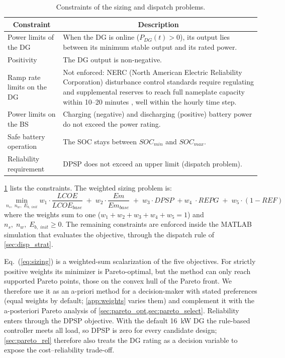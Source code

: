 \documentclass[final,3p,times]{elsarticle}
\begin{document}
\begin{table}[htbp] 
\centering
\begin{tabular}{p{5cm} p{10cm}}
\toprule
\multicolumn{1}{c}{\textbf{Constraint}} & \multicolumn{1}{c}{\textbf{Description}}    \\
\midrule
Power limits of the DG & When the DG is online ($P_{DG}(t) > 0$), its output lies between its minimum stable output and its rated power. \\ [1ex]
Positivity & The DG output is non-negative. \\ [1ex]
Ramp rate limits on the DG & Not enforced: NERC (North American Electric Reliability Corporation) disturbance control standards require regulating and supplemental reserves to reach full nameplate capacity within 10--20 minutes \cite{nerc}, well within the hourly time step. \\ [1ex]
Power limits on the BS & Charging (negative) and discharging (positive) battery power do not exceed the power rating. \\ [1ex]
Safe battery operation & The SOC stays between $SOC_{min}$ and $SOC_{max}$. \\ [1ex]
Reliability requirement & DPSP does not exceed an upper limit (dispatch problem). \\ [1ex]
\bottomrule
\end{tabular}
\caption{Constraints of the sizing and dispatch problems.}
\label{tab:dispatch_constraints} 
\end{table}

\cref{tab:dispatch_constraints} lists the constraints. The weighted sizing problem is:
\begin{equation}
    \label{eq:sizing}
    \min_{n_s, \; n_w, \; E_{b,\;init}} w_1 \cdot \frac{LCOE}{LCOE_{base}} \; + \; w_2 \cdot \frac{Em}{Em_{base}} \; + \; w_3 \cdot DPSP \; + w_4 \; \cdot REPG \; + \; w_5 \cdot (1-REF)
\end{equation}
where the weights sum to one ($w_1 + w_2 + w_3 + w_4 + w_5 = 1$) and $n_s, \; n_w, \; E_{b,\; init} \geq 0$. The remaining constraints are enforced inside the MATLAB simulation that evaluates the objective, through the dispatch rule of \cref{sec:disp_strat}.

Eq.~(\ref{eq:sizing}) is a weighted-sum scalarization of the five objectives. For strictly positive weights its minimizer is Pareto-optimal, but the method can only reach supported Pareto points, those on the convex hull of the Pareto front. We therefore use it as an a-priori method for a decision-maker with stated preferences (equal weights by default; \cref{app:weights} varies them) and complement it with the a-posteriori Pareto analysis of \cref{sec:pareto_opt,sec:pareto_select}. Reliability enters through the DPSP objective. With the default 16~kW DG the rule-based controller meets all load, so DPSP is zero for every candidate design; \cref{sec:pareto_rel} therefore also treats the DG rating as a decision variable to expose the cost--reliability trade-off.
\end{document}

